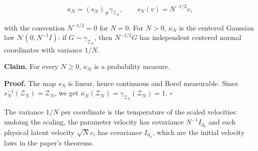 \documentclass[11pt,a4paper]{article}
\begin{document}
\[\kappa_N=(s_N)_\#\gamma_{\mathcal Z_N},\qquad s_N(v)=N^{-1/2}v,\]


with the convention \(N^{-1/2}=0\) for \(N=0\). For \(N>0\), \(\kappa_N\) is the centered Gaussian law \(\mathcal N(0,N^{-1}I)\): if \(G\sim\gamma_{\mathcal Z_N}\), then \(N^{-1/2}G\) has independent centered normal coordinates with variance \(1/N\).




\textbf{Claim.} For every \(N\ge0\), \(\kappa_N\) is a probability measure.




\textbf{Proof.} The map \(s_N\) is linear, hence continuous and Borel measurable. Since \(s_N^{-1}(\mathcal Z_N)=\mathcal Z_N\), we get \(\kappa_N(\mathcal Z_N)=\gamma_{\mathcal Z_N}(\mathcal Z_N)=1\). \(\square\)




The variance \(1/N\) per coordinate is the temperature of the scaled velocities: undoing the scaling, the parameter velocity has covariance \(N^{-1}I_{d_\theta}\) and each physical latent velocity \(\sqrt N v_i\) has covariance \(I_{d_x}\), which are the initial velocity laws in the paper's theorems.
\end{document}

